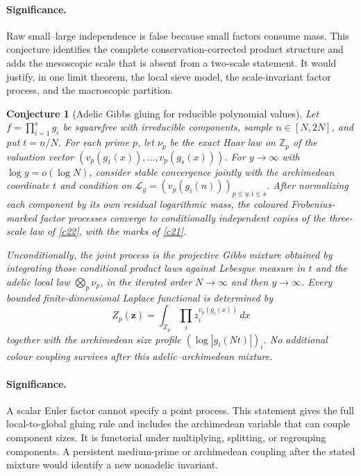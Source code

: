 \documentclass[11pt]{article}
\newtheorem{conjecture}{Conjecture}
\newcommand{\Z}{\mathbb Z}
\begin{document}
\paragraph{Significance.}
Raw small--large independence is false because small factors consume mass.  This
conjecture identifies the complete conservation-corrected product structure and adds the
mesoscopic scale that is absent from a two-scale statement.  It would justify, in one
limit theorem, the local sieve model, the scale-invariant factor process, and the
macroscopic partition.

\begin{conjecture}[Adelic Gibbs gluing for reducible polynomial values]\label{c23}
Let $f=\prod_{i=1}^s g_i$ be squarefree with irreducible components, sample
$n\in[N,2N]$, and put $t=n/N$.  For each prime $p$, let $\nu_p$ be the exact Haar law on
$\Z_p$ of the valuation vector
$(v_p(g_1(x)),\ldots,v_p(g_s(x)))$.  For
$y\to\infty$ with $\log y=o(\log N)$, consider stable convergence jointly with the
archimedean coordinate $t$ and condition on
$\mathscr L_y=(v_p(g_i(n)))_{p\le y,i\le s}$.  After normalizing each component by its
own residual logarithmic mass, the coloured Frobenius-marked factor processes converge
to conditionally independent copies of the three-scale law of \cref{c22}, with the
marks of \cref{c21}.

Unconditionally, the joint process is the projective Gibbs mixture obtained by
integrating those conditional product laws against Lebesgue measure in $t$ and the
adelic local law $\bigotimes_p\nu_p$, in the iterated order $N\to\infty$ and then
$y\to\infty$.  Every bounded finite-dimensional Laplace functional is determined by
\[
 Z_p(\mathbf z)=\int_{\Z_p}\prod_i z_i^{v_p(g_i(x))}\,dx
\]
together with the archimedean size profile $(\log|g_i(Nt)|)_i$.  No additional colour
coupling survives after this adelic--archimedean mixture.
\end{conjecture}

\paragraph{Significance.}
A scalar Euler factor cannot specify a point process.  This statement gives the full
local-to-global gluing rule and includes the archimedean variable that can couple
component sizes.  It is functorial under multiplying, splitting, or regrouping
components.  A persistent medium-prime or archimedean coupling after the stated mixture
would identify a new nonadelic invariant.
\end{document}
